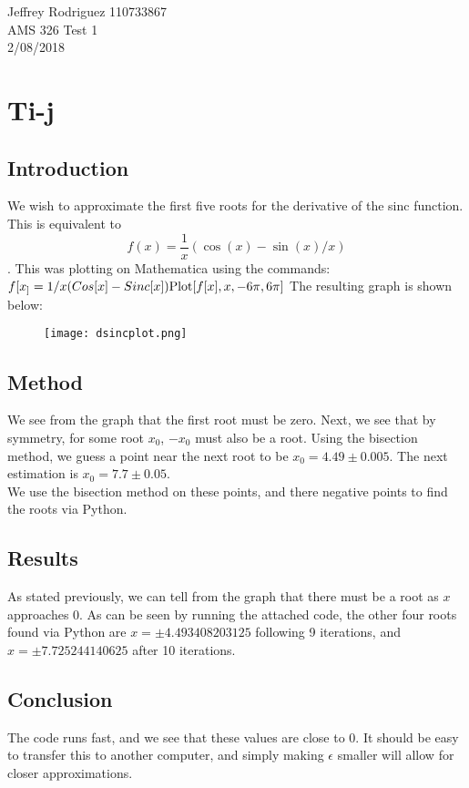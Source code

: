 \documentclass[12pt]{article}
\begin{document}
\begin{center}
Jeffrey Rodriguez 110733867\\AMS 326 Test 1 \\2/08/2018\\

\end{center}

\section*{Ti-j}
\subsection*{Introduction}
We wish to approximate the first five roots for the derivative of the sinc function. This is equivalent to $$f(x) = \frac{1}{x}(\cos(x)-\sin(x)/x)$$. This was plotting on Mathematica using the commands: 
\\ \texttt{$f[x_] = 1/x (Cos[x] - Sinc[x])
\\\text{Plot}[f[x], {x, -6\pi, 6 \pi}]$}
The resulting graph is shown below:
\begin{figure}[h]
	\begin{center}
		\texttt{[image: dsincplot.png]}
	\end{center}
\end{figure}
\subsection*{Method}
We see from the graph that the first root must be zero. Next, we see that by symmetry, for some root $x_0$, $-x_0$ must also be a root. Using the bisection method, we guess a point near the next root to be $x_0 = 4.49 \pm 0.005$. The next estimation is $x_0 = 7.7 \pm 0.05$.
\\We use the bisection method on these points, and there negative points to find the roots via Python.
\subsection*{Results}
As stated previously, we can tell from the graph that there must be a root as $x$ approaches 0. As can be seen by running the attached code, the other four roots found via Python are $x = \pm4.493408203125$ following 9 iterations, and $x = \pm 7.725244140625$ after 10 iterations.
\subsection*{Conclusion}
The code runs fast, and we see that these values are close to 0. It should be easy to transfer this to another computer, and simply making $\epsilon$ smaller will allow for closer approximations.
\end{document}
